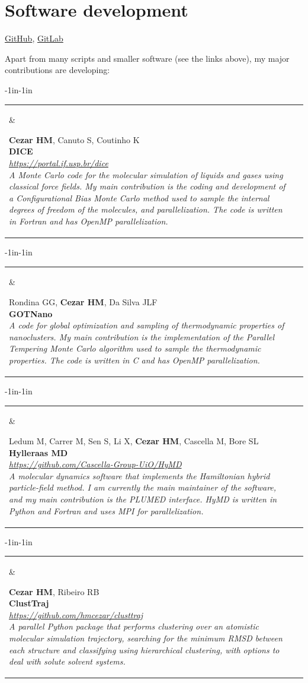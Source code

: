 \documentclass[10pt]{article}
\newcommand{\newsoftware}[3]{
\begin{adjustwidth}{-1in}{-1in}  
\begin{tabular}{p{0.9in}p{7in}}
\parbox[c]{0.9in}{} & \parbox[c]{6in}{\setstretch{0.9} {\scriptsize {#1}} \\ {\bf #2}  \\ {\footnotesize\emph {#3}}}
\end{tabular}
\end{adjustwidth}
\vspace{0.2in}
}
\begin{document}





\section*{Software development}
\href{https://github.com/hmcezar}{GitHub}, 
\href{https://gitlab.com/hmcezar}{GitLab}

Apart from many scripts and smaller software (see the links above), my major contributions are developing:\\

\newsoftware{\textbf{Cezar HM}, Canuto S, Coutinho K}{DICE}{\href{https://portal.if.usp.br/dice}{https://portal.if.usp.br/dice} \\ 
A Monte Carlo code for the molecular simulation of liquids and gases using classical force fields. My main contribution is the coding and development of a Configurational Bias Monte Carlo method used to sample the internal degrees of freedom of the molecules, and parallelization. The code is written in Fortran and has OpenMP parallelization.}

\newsoftware{Rondina GG, \textbf{Cezar HM}, Da Silva JLF}{GOTNano}{ 
A code for global optimization and sampling of thermodynamic properties of nanoclusters. My main contribution is the implementation of the Parallel Tempering Monte Carlo algorithm used to sample the thermodynamic properties. The code is written in C and has OpenMP parallelization.}

\newsoftware{Ledum M, Carrer M, Sen S, Li X, \textbf{Cezar HM}, Cascella M, Bore SL}{Hylleraas MD}{\href{https://github.com/Cascella-Group-UiO/HyMD}{https://github.com/Cascella-Group-UiO/HyMD} \\ 
A molecular dynamics software that implements the Hamiltonian hybrid particle-field method. I am currently the main maintainer of the software, and my main contribution is the PLUMED interface. HyMD is written in Python and Fortran and uses MPI for parallelization.}

\newsoftware{\textbf{Cezar HM}, Ribeiro RB}{ClustTraj}{\href{https://github.com/hmcezar/clusttraj}{https://github.com/hmcezar/clusttraj} \\ 
A parallel Python package that performs clustering over an atomistic molecular simulation trajectory, searching for the minimum RMSD between each structure and classifying using hierarchical clustering, with options to deal with solute solvent systems.}
\end{document}
